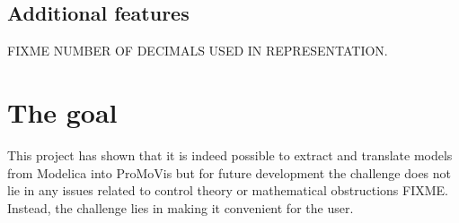 \subsection{Additional features} 
FIXME NUMBER OF DECIMALS USED IN REPRESENTATION.
\section{The goal}
This project has shown that it is indeed possible to extract and translate models from Modelica into ProMoVis but for future development the challenge does not lie in any issues related to control theory or mathematical obstructions FIXME. Instead, the challenge lies in making it convenient for the user. 
